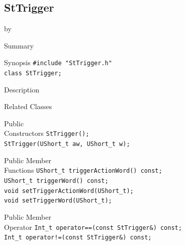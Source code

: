 \documentclass[twoside]{article}
\newcommand{\entrylabel}[1]{\mbox{\textbf{{#1}}}\hfil}%
\newenvironment{entry}
{\begin{list}{}%
    {\renewcommand{\makelabel}{\entrylabel}%
     \setlength{\labelwidth}{90pt}%
     \setlength{\leftmargin}{\labelwidth}
     \advance\leftmargin by \labelsep%
      }%
    }%
  {\end{list}}
\newcommand{\Entrylabel}[1]%
{\raisebox{0pt}[1ex][0pt]{\makebox[\labelwidth][l]%
    {\parbox[t]{\labelwidth}{\hspace{0pt}\textbf{{#1}}}}}}
\newenvironment{Entry}%
{\renewcommand{\entrylabel}{\Entrylabel}\begin{entry}}%
  {\end{entry}}
\begin{document}
\subsection{StTrigger}
\label{sec:StTrigger}
\begin{Entry}
\item[Summary]
\item[Synopsis]
    \verb+#include "StTrigger.h"+\\
    \verb+class StTrigger;+\\
\item[Description]
\item[Related Classes]
\item[Public\\ Constructors]
    \verb+StTrigger();+\\
    \verb+StTrigger(UShort_t aw, UShort_t w);+\\
\item[Public Member\\ Functions]
    \verb+UShort_t triggerActionWord() const;+\\
    \verb+UShort_t triggerWord() const;+\\
    \verb+void setTriggerActionWord(UShort_t);+\\
    \verb+void setTriggerWord(UShort_t);+\\
\item[Public Member\\ Operator]
    \verb+Int_t operator==(const StTrigger&) const;+\\
    \verb+Int_t operator!=(const StTrigger&) const;+\\
 \end{Entry}
 \clearpage
\end{document}
